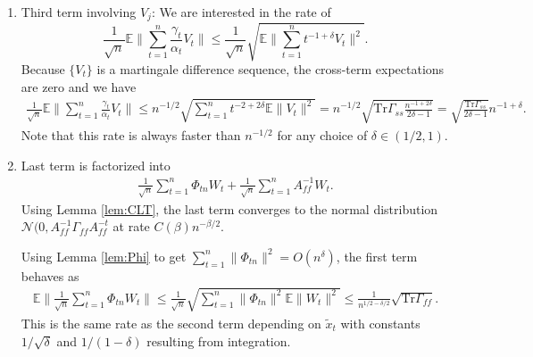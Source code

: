\begin{enumerate}
    \item Third term involving $V_j$: 
    We are interested in the rate of 
    \begin{equation}
        \frac{1}{\sqrt{n}} \mathbb{E} \lVert \sum_{t=1}^n \frac{\gamma_t}{\alpha_t} V_t \rVert \leq \frac{1}{\sqrt{n}} \sqrt{\mathbb{E}\lVert \sum_{t=1}^n t^{-1 + \delta} V_t \rVert^2}.
    \end{equation}
    Because $\{V_t\}$ is a martingale difference sequence, the cross-term expectations are zero and we have
    \begin{align*}
         \frac{1}{\sqrt{n}} \mathbb{E} \lVert \sum_{t=1}^n \frac{\gamma_t}{\alpha_t} V_t \rVert \leq 
         n^{-1/2} \sqrt{\sum_{t=1}^n t^{-2 + 2\delta} \mathbb{E} \lVert V_t \rVert^2}
         = n^{-1/2} \sqrt{\mathrm{Tr} \Gamma_{ss} \frac{n^{-1 + 2\delta}}{2\delta - 1}}
         = \sqrt{\frac{\mathrm{Tr} \Gamma_{ss}}{2\delta - 1}} n^{-1 + \delta} .
    \end{align*}
    Note that this rate is always faster than $n^{-1/2}$ for any choice of $\delta \in (1/2, 1)$.
        
    \item Last term is factorized into
    \begin{align*}
        \frac{1}{\sqrt{n}}\sum_{t=1}^{n} \Phi_{tn} W_t + \frac{1}{\sqrt{n}} \sum_{t=1}^{n} A_{ff}^{-1} W_t .
    \end{align*}
    Using Lemma \ref{lem:CLT}, the last term converges to the normal distribution $\mathcal{N}(0, A_{ff}^{-1} \Gamma_{ff} A_{ff}^{-t}$ at rate $C(\beta) n^{-\beta/2}$. 
    
    
    Using Lemma \ref{lem:Phi} to get $\sum_{t=1}^n \lVert \Phi_{tn} \rVert^2 = O(n^{\delta})$, the first term behaves as
    \begin{align*}
        \mathbb{E}\lVert \frac{1}{\sqrt{n}} \sum_{t=1}^n \Phi_{tn} W_t \rVert 
        \leq \frac{1}{\sqrt{n}} \sqrt{\sum_{t=1}^n \lVert \Phi_{tn} \rVert^2 \mathbb{E} \lVert W_t \rVert^2}
        \leq 
        \frac{1}{n^{1/2 - \delta /2}} \sqrt{\mathrm{Tr} \Gamma_{ff}}
        .
    \end{align*}
    This is the same rate as the second term depending on $\tilde{x}_t$ with constants $1/\sqrt{\delta}$ and $1/(1-\delta)$ resulting from integration.    
\end{enumerate}
